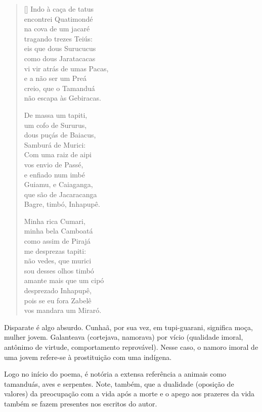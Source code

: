 \documentclass[12pt]{book}
\begin{document}
		\begin{verse}[\versewidth]
			Indo à caça de tatus \\
			encontrei Quatimondé \\
			na cova de um jacaré \\
			tragando trezes Teiús: \\
			eis que dous Surucucus \\
			como dous Jaratacacas\\
			vi vir atrás de umas Pacas,\\
			e a não ser um Preá \\
			creio, que o Tamanduá \\
			não escapa às Gebiracas.
			
			De massa um tapiti, \\
			um cofo de Sururus, \\
			dous puçás de Baiacus, \\
			Samburá de Murici: \\
			Com uma raiz de aipi \\
			vos envio de Passé, \\
			e enfiado num imbé \\
			Guiamu, e Caiaganga, \\
			que são de Jacaracanga \\
			Bagre, timbó, Inhapupê.
			
			Minha rica Cumari, \\
			minha bela Camboatá \\
			como assim de Pirajá \\
			me desprezas tapiti: \\
			não vedes, que murici \\
			sou desses olhos timbó \\
			amante mais que um cipó \\
			desprezado Inhapupê, \\
			pois se eu fora Zabelê \\
			vos mandara um Miraró.
		\end{verse}
		\par Disparate é algo absurdo. Cunhaã, por sua vez, em tupi-guarani, significa moça, mulher jovem. Galanteava (cortejava, namorava) por vício (qualidade imoral, antônimo de virtude, comportamento reprovável). Nesse caso, o namoro imoral de uma jovem refere-se à prostituição com uma indígena.
		\par Logo no início do poema, é notória a extensa referência a animais como tamanduás, aves e serpentes. Note, também, que a dualidade (oposição de valores) da preocupação com a vida após a morte e o apego aos prazeres da vida também se fazem presentes nos escritos do autor.
\end{document}
